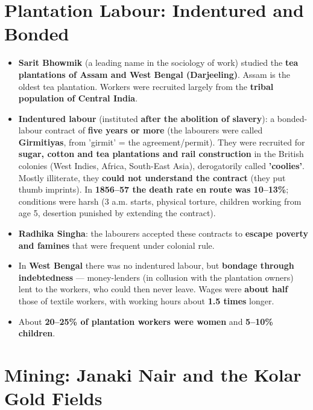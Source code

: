 \section{Plantation Labour: Indentured and Bonded}

\begin{KeyConcept}
\begin{itemize}
\item \textbf{Sarit Bhowmik} (a leading name in the sociology of work) studied the \textbf{tea plantations of Assam and West Bengal (Darjeeling)}. Assam is the oldest tea plantation. Workers were recruited largely from the \textbf{tribal population of Central India}.
\item \textbf{Indentured labour} (instituted \textbf{after the abolition of slavery}): a bonded-labour contract of \textbf{five years or more} (the labourers were called \textbf{Girmitiyas}, from 'girmit' = the agreement/permit). They were recruited for \textbf{sugar, cotton and tea plantations and rail construction} in the British colonies (West Indies, Africa, South-East Asia), derogatorily called \textbf{'coolies'}. Mostly illiterate, they \textbf{could not understand the contract} (they put thumb imprints). In \textbf{1856--57 the death rate en route was 10--13\%}; conditions were harsh (3 a.m. starts, physical torture, children working from age 5, desertion punished by extending the contract).
\item \textbf{Radhika Singha}: the labourers accepted these contracts to \textbf{escape poverty and famines} that were frequent under colonial rule.
\item In \textbf{West Bengal} there was no indentured labour, but \textbf{bondage through indebtedness} --- money-lenders (in collusion with the plantation owners) lent to the workers, who could then never leave. Wages were \textbf{about half} those of textile workers, with working hours about \textbf{1.5 times} longer.
\item About \textbf{20--25\% of plantation workers were women} and \textbf{5--10\% children}.
\end{itemize}
\end{KeyConcept}

\section{Mining: Janaki Nair and the Kolar Gold Fields}

